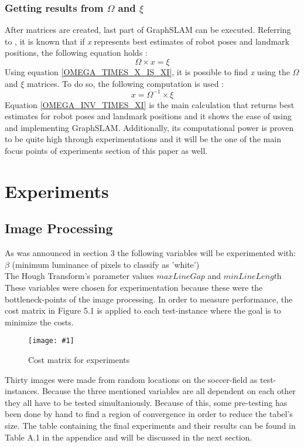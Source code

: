 \documentclass{ba-kecs}
\numberwithin{figure}{section}
\numberwithin{equation}{section}
\newcommand{\dkepic}[2]{ %
	\begin{figure}[H] %
	\texttt{[image: \#1]}
	\caption{#2}
	\label{#1}
	\end{figure}
}
\begin{document}
\subsubsection{Getting results from $\Omega$ and $\xi$}
	After matrices are created, last part of GraphSLAM can be executed. Referring to \cite{sik2}, it is known that if \textit{x} represents best estimates of robot poses and landmark positions, the following equation holds :
	\begin{equation}
	\Omega \times x = \xi \label{OMEGA_TIMES_X_IS_XI}
	\end{equation}
	Using equation \eqref{OMEGA_TIMES_X_IS_XI}, it is possible to find \textit{x} using the $\Omega$ and $\xi$ matrices. To do so, the following computation is used :
	\begin{equation}
	x = \Omega^{-1} \times \xi \label{OMEGA_INV_TIMES_XI}
	\end{equation}
	Equation \eqref{OMEGA_INV_TIMES_XI} is the main calculation that returns best estimates for robot poses and landmark positions and it shows the ease of using and implementing GraphSLAM. Additionally, its computational power is proven to be quite high through experimentations\cite{sik,sik2} and it will be the one of the main focus points of experiments section of this paper as well.



\section{Experiments}

\subsection{Image Processing}
As was announced in section 3 the following variables will be experimented with: \\
$\beta$ (minimum luminance of pixels to classify as 'white')\\
The Hough Transform's parameter values $\textit{maxLineGap}$ and $\textit{minLineLength}$ \\
These variables were chosen for experimentation because these were the bottleneck-points of the image processing. 
In order to measure performance, the cost matrix in Figure 5.1 is applied to each test-instance where the goal is to minimize the costs.
\dkepic{figure_IP6}{Cost matrix for experiments}
Thirty images were made from random locations on the soccer-field as test-instances.
Because the three mentioned variables are all dependent on each other they all have to be tested simultaniously. Because of this, some pre-testing has been done by hand to find a region of convergence in order to reduce the tabel's size. The table containing the final experiments and their results can be found in Table A.1 in the appendice and will be discussed in the next section.
\end{document}
